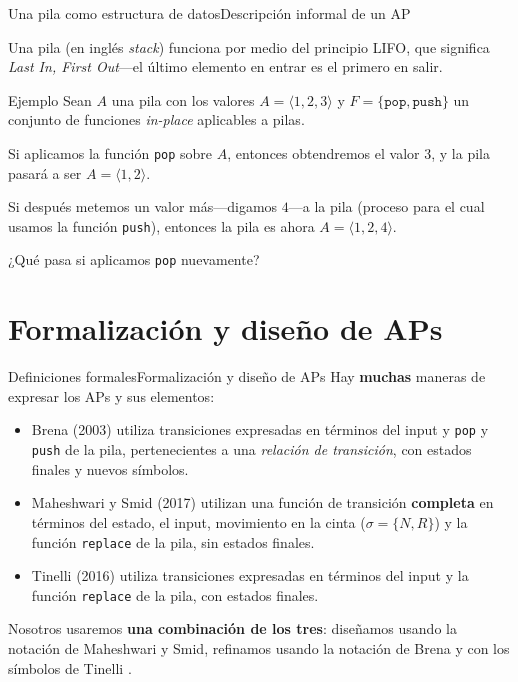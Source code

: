 \documentclass[spanish, handout]{beamer}
\begin{document}
\begin{frame}{Una pila como estructura de datos}{Descripción informal de un AP}

    Una \alert{pila} (en inglés \textit{stack}) funciona por medio del principio \alert{LIFO}, que significa \textit{Last In, First Out}---el último elemento en entrar es el primero en salir. \pause

    \bigskip

    \begin{exampleblock}{Ejemplo}
        Sean $A$ una pila con los valores $A = \langle 1, 2, 3 \rangle$ y $F = \{\mathtt{pop}, \mathtt{push}\}$ un conjunto de funciones \textit{in-place} aplicables a pilas.
    \end{exampleblock} \pause

    \bigskip

    Si aplicamos la función \texttt{pop} sobre $A$, entonces obtendremos el valor $3$, y la pila pasará a ser $A = \langle 1,2 \rangle$. \pause

    \bigskip
    
    Si después metemos un valor más---digamos $4$---a la pila (proceso para el cual usamos la función \texttt{push}), entonces la pila es ahora $A = \langle 1, 2, 4 \rangle$. \pause

    \bigskip
    
    ¿Qué pasa si aplicamos \texttt{pop} nuevamente?
\end{frame}

\section{Formalización y diseño de APs}

\begin{frame}{Definiciones formales}{Formalización y diseño de APs}
    Hay \textbf{muchas} maneras de expresar los APs y sus elementos: \pause
    \begin{itemize}
        \itemsep1.5ex
        \item Brena (2003) utiliza transiciones expresadas en términos del input y \texttt{pop} y \texttt{push} de la pila, pertenecientes a una \textit{relación de transición}, con estados finales y nuevos símbolos. \pause
        \item Maheshwari y Smid (2017) utilizan una función de transición \textbf{completa} en términos del estado, el input, movimiento en la cinta ($\sigma = \{N,R\}$) y la función \texttt{replace} de la pila, sin estados finales. \pause
        \item Tinelli (2016) utiliza transiciones expresadas en términos del input y la función \texttt{replace} de la pila, con estados finales. 
    \end{itemize} \pause

    \bigskip

    Nosotros usaremos \textbf{una combinación de los tres}: diseñamos usando la notación de Maheshwari y Smid, refinamos usando la notación de Brena y con los símbolos de Tinelli .
\end{frame}
\end{document}
